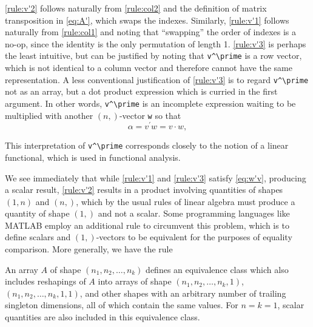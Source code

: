 \ref{rule:v'2} follows naturally from \ref{rule:col2} and the definition of
matrix transposition in \eqref{eq:A'}, which swaps the indexes. Similarly,
\ref{rule:v'1} follows naturally from \ref{rule:col1} and noting that
``swapping'' the order of indexes is a no-op, since the identity is the only
permutation of length 1. \ref{rule:v'3} is perhaps the least intuitive, but
can be justified by noting that \lstinline|v^\prime| is a row vector, which is not
identical to a column vector and therefore cannot have the same representation.
A less conventional justification of \ref{rule:v'3} is to regard \lstinline|v^\prime|
not as an array, but a dot product expression which is curried in the first
argument. In other words, \lstinline|v^\prime| is an incomplete expression waiting to
be multiplied with another $(n,)$-vector \lstinline|w| so that
%
\begin{equation}
	\alpha = v^\prime w = v \cdot w,\label{eq:w'v}
\end{equation}
%
%


This interpretation of \lstinline|v^\prime| corresponds closely to the notion of a
linear functional, which is used in functional analysis.

We see immediately that while \ref{rule:v'1} and \ref{rule:v'3} satisfy
\eqref{eq:w'v}, producing a scalar result, \ref{rule:v'2} results in a product
involving quantities of shapes $(1,n)$ and $(n,)$, which by the usual rules of
linear algebra must produce a quantity of shape $(1,)$ and not a scalar. Some
programming languages like MATLAB employ an additional rule to circumvent this
problem, which is to define scalars and $(1,)$-vectors to be equivalent for the
purposes of equality comparison. More generally, we have the rule

An array $A$ of shape $(n_1, n_2, \dots, n_k)$ defines an equivalence
class which also includes reshapings of $A$ into arrays of shape $(n_1, n_2,
\dots, n_k, 1)$, $(n_1, n_2, \dots, n_k, 1, 1)$, and other shapes with an
arbitrary number of trailing singleton dimensions, all of which contain the
same values. For $n = k = 1$, scalar quantities are also included in this
equivalence class.\label{rule:trail1}

